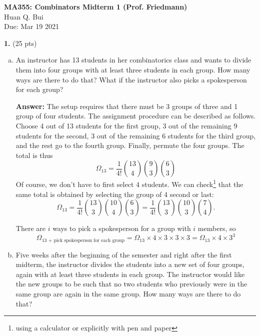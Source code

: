 \documentclass[11pt]{article}
\newcommand{\f}[2]{\frac{#1}{#2}}
\begin{document}
	\begin{framed}
\begin{center}
{\large \bf MA355: Combinators Midterm 1 (Prof. Friedmann)}\\
{ Huan Q. Bui}\\
Due: Mar 19 2021
\end{center}
\end{framed}

\noindent \textbf{1.} (25 pts) 
\begin{enumerate}[(a)]
	\item An instructor has 13 students in her combinatorics class and wants to divide them
	into four groups with at least three students in each group. How many ways are
	there to do that? What if the instructor also picks a spokesperson for each group?
	
	\textbf{Answer:} The setup requires that there must be 3 groups of three and 1 group of four students. The assignment procedure can be described as follows. Choose 4 out of 13 students for the first group, 3 out of the remaining 9 students for the second, 3 out of the remaining 6 students for the third group, and the rest go to the fourth group. Finally, permute the four groups. The total is thus
	\begin{equation*}
	\boxed{\Omega_{13} = \f{1}{4!}\binom{13}{4}\binom{9}{3}\binom{6}{3}}
	\end{equation*}
	Of course, we don't have to first select 4 students. We can check\footnote{using a calculator or explicitly with pen and paper} that the same total is obtained by selecting the group of 4 second or last:
	\begin{equation*}
	\Omega_{13} = \f{1}{4!}\binom{13}{3}\binom{10}{4}\binom{6}{3} = \f{1}{4!}\binom{13}{3}\binom{10}{3}\binom{7}{4}.
	\end{equation*}
	
	
	There are $i$ ways to pick a spokesperson for a group with $i$ members, so
	\begin{equation*}
	\boxed{\Omega_\text{13 + pick spokesperson for each group} = \Omega_{13} \times 4\times 3 \times 3 \times 3 = \Omega_{13} \times 4\times 3^3}
	\end{equation*} 
	
	
	\item Five weeks after the beginning of the semester and right after the first midterm,
	the instructor divides the students into a new set of four groups, again with at least
	three students in each group. The instructor would like the new groups to be such
	that no two students who previously were in the same group are again in the same
	group. How many ways are there to do that?


\end{enumerate}
\end{document}
